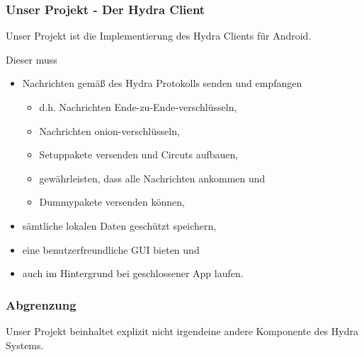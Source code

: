 \documentclass[t]{beamer}
\begin{document}
    \begin{frame}
   		\frametitle{Unser Projekt - Der Hydra Client}
        \pause

   		Unser Projekt ist die Implementierung des Hydra Clients für Android.

   		Dieser muss
   		\begin{itemize}
   			\item Nachrichten gemäß des Hydra Protokolls senden und empfangen
   			\pause
   			\begin{itemize}
   				\item d.h. Nachrichten Ende-zu-Ende-verschlüsseln,
   				\pause
   				\item Nachrichten onion-verschlüsseln,
   				\pause
   				\item Setuppakete versenden und Circuts aufbauen,
   				\pause
   				\item  gewährleisten, dass alle Nachrichten ankommen und
   				\pause
   				\item  Dummypakete versenden können,
   				\pause
   				
   	 
   			\end{itemize}
   			\item sämtliche lokalen Daten geschützt speichern,
   			\pause
   			\item eine benutzerfreundliche GUI bieten und
   			\pause
   			\item auch im Hintergrund bei geschlossener App laufen.
   		\end{itemize}
   	\end{frame}
   	\begin{frame}
   		\frametitle{Abgrenzung}
   		\pause
   		
        \raggedright
   		Unser Projekt beinhaltet explizit nicht irgendeine andere Komponente des Hydra Systems.
   	\end{frame}	
   
\end{document}
